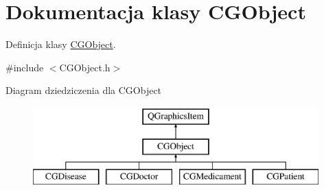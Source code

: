 \hypertarget{class_c_g_object}{}\section{Dokumentacja klasy C\+G\+Object}
\label{class_c_g_object}


Definicja klasy \mbox{\hyperlink{class_c_g_object}{C\+G\+Object}}.  




{\ttfamily \#include $<$C\+G\+Object.\+h$>$}

Diagram dziedziczenia dla C\+G\+Object\begin{figure}[H]
\begin{center}
\leavevmode
\includegraphics[height=3.000000cm]{class_c_g_object}
\end{center}
\end{figure}
